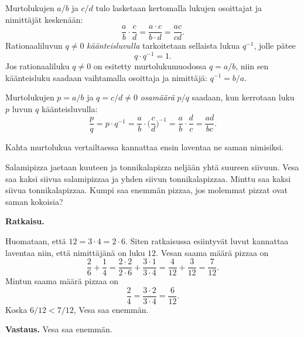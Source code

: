 Murtolukujen $a/b$ ja $c/d$ tulo lasketaan kertomalla lukujen osoittajat ja nimittäjät keskenään:
\[
\frac{a}{b}\cdot \frac{c}{d} = \frac{a\cdot c}{b\cdot d} = \frac{ac}{cd}.
\]
Rationaaliluvun $q\neq 0$ \emph{käänteisluvulla} tarkoitetaan sellaista lukua $q^{-1}$, jolle pätee
\[
q\cdot q^{-1} = 1.
\]
Jos rationaaliluku $q\neq 0$ on esitetty murtolukumuodossa $q=a/b$, niin sen käänteisluku saadaan vaihtamalla osoittaja ja nimittäjä: $q^{-1} = b/a$.

Murtolukujen $p=a/b$ ja $q=c/d\neq 0$ \emph{osamäärä} $p/q$ saadaan, kun kerrotaan luku $p$ luvun $q$ käänteisluvulla:
\[
\frac{p}{q} = p\cdot q^{-1} = \frac{a}{b}\cdot\Big(\frac{c}{d}\Big)^{-1} = \frac{a}{b}\cdot \frac{d}{c}
= \frac{ad}{bc}.
\]




Kahta murtolukua vertailtaessa kannattaa ensin laventaa ne saman nimisiksi.

\begin{esimerkki}
Salamipizza jaetaan kuuteen ja tonnikalapizza neljään yhtä suureen siivuun. Vesa saa kaksi siivua salamipizzaa ja yhden siivun tonnikalapizzaa. Minttu saa kaksi siivua tonnikalapizzaa. Kumpi saa enemmän pizzaa, jos molemmat pizzat ovat saman kokoisia?


{\bf Ratkaisu.}

Huomataan, että $12 = 3\cdot 4 = 2\cdot 6$. Siten ratkaisussa esiintyvät luvut kannattaa laventaa niin, että nimittäjänä on luku $12$. Vesan saama määrä pizzaa on
\[
\frac{2}{6} + \frac{1}{4} = \frac{2\cdot 2}{2\cdot 6} + \frac{3\cdot 1}{3\cdot 4} 
=\frac{4}{12}+\frac{3}{12} = \frac{7}{12}.
\]
Mintun saama määrä pizzaa on
\[
\frac{2}{4} = \frac{3\cdot 2}{3\cdot 4} = \frac{6}{12}.
\]
Koska $6/12 < 7/12$, Vesa saa enemmän.

{\bf Vastaus.} Vesa saa enemmän.
\end{esimerkki}



